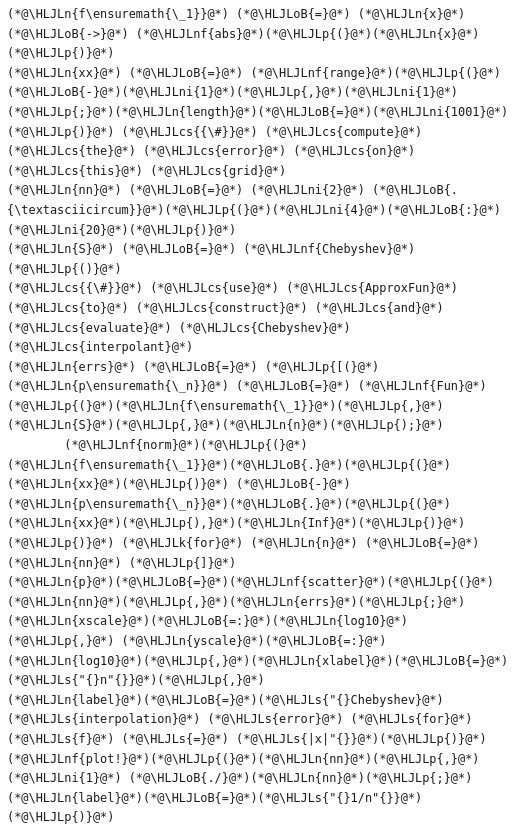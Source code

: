 \documentclass[12pt,a4paper]{article}
\newcommand{\HLJLk}[1]{\textcolor[RGB]{148,91,176}{\textbf{#1}}}
\newcommand{\HLJLn}[1]{#1}
\newcommand{\HLJLnf}[1]{\textcolor[RGB]{66,102,213}{#1}}
\newcommand{\HLJLs}[1]{\textcolor[RGB]{201,61,57}{#1}}
\newcommand{\HLJLni}[1]{\textcolor[RGB]{59,151,46}{#1}}
\newcommand{\HLJLoB}[1]{\textcolor[RGB]{102,102,102}{\textbf{#1}}}
\newcommand{\HLJLp}[1]{#1}
\newcommand{\HLJLcs}[1]{\textcolor[RGB]{153,153,119}{\textit{#1}}}
\begin{document}
\begin{lstlisting}
(*@\HLJLn{f\ensuremath{\_1}}@*) (*@\HLJLoB{=}@*) (*@\HLJLn{x}@*) (*@\HLJLoB{->}@*) (*@\HLJLnf{abs}@*)(*@\HLJLp{(}@*)(*@\HLJLn{x}@*)(*@\HLJLp{)}@*)
(*@\HLJLn{xx}@*) (*@\HLJLoB{=}@*) (*@\HLJLnf{range}@*)(*@\HLJLp{(}@*)(*@\HLJLoB{-}@*)(*@\HLJLni{1}@*)(*@\HLJLp{,}@*)(*@\HLJLni{1}@*)(*@\HLJLp{;}@*)(*@\HLJLn{length}@*)(*@\HLJLoB{=}@*)(*@\HLJLni{1001}@*)(*@\HLJLp{)}@*) (*@\HLJLcs{{\#}}@*) (*@\HLJLcs{compute}@*) (*@\HLJLcs{the}@*) (*@\HLJLcs{error}@*) (*@\HLJLcs{on}@*) (*@\HLJLcs{this}@*) (*@\HLJLcs{grid}@*)
(*@\HLJLn{nn}@*) (*@\HLJLoB{=}@*) (*@\HLJLni{2}@*) (*@\HLJLoB{.{\textasciicircum}}@*)(*@\HLJLp{(}@*)(*@\HLJLni{4}@*)(*@\HLJLoB{:}@*)(*@\HLJLni{20}@*)(*@\HLJLp{)}@*)
(*@\HLJLn{S}@*) (*@\HLJLoB{=}@*) (*@\HLJLnf{Chebyshev}@*)(*@\HLJLp{()}@*)
(*@\HLJLcs{{\#}}@*) (*@\HLJLcs{use}@*) (*@\HLJLcs{ApproxFun}@*) (*@\HLJLcs{to}@*) (*@\HLJLcs{construct}@*) (*@\HLJLcs{and}@*) (*@\HLJLcs{evaluate}@*) (*@\HLJLcs{Chebyshev}@*) (*@\HLJLcs{interpolant}@*)
(*@\HLJLn{errs}@*) (*@\HLJLoB{=}@*) (*@\HLJLp{[(}@*) (*@\HLJLn{p\ensuremath{\_n}}@*) (*@\HLJLoB{=}@*) (*@\HLJLnf{Fun}@*)(*@\HLJLp{(}@*)(*@\HLJLn{f\ensuremath{\_1}}@*)(*@\HLJLp{,}@*)(*@\HLJLn{S}@*)(*@\HLJLp{,}@*)(*@\HLJLn{n}@*)(*@\HLJLp{);}@*)
        (*@\HLJLnf{norm}@*)(*@\HLJLp{(}@*)(*@\HLJLn{f\ensuremath{\_1}}@*)(*@\HLJLoB{.}@*)(*@\HLJLp{(}@*)(*@\HLJLn{xx}@*)(*@\HLJLp{)}@*) (*@\HLJLoB{-}@*) (*@\HLJLn{p\ensuremath{\_n}}@*)(*@\HLJLoB{.}@*)(*@\HLJLp{(}@*)(*@\HLJLn{xx}@*)(*@\HLJLp{),}@*)(*@\HLJLn{Inf}@*)(*@\HLJLp{)}@*)  (*@\HLJLp{)}@*) (*@\HLJLk{for}@*) (*@\HLJLn{n}@*) (*@\HLJLoB{=}@*) (*@\HLJLn{nn}@*) (*@\HLJLp{]}@*)
(*@\HLJLn{p}@*)(*@\HLJLoB{=}@*)(*@\HLJLnf{scatter}@*)(*@\HLJLp{(}@*)(*@\HLJLn{nn}@*)(*@\HLJLp{,}@*)(*@\HLJLn{errs}@*)(*@\HLJLp{;}@*)(*@\HLJLn{xscale}@*)(*@\HLJLoB{=:}@*)(*@\HLJLn{log10}@*)(*@\HLJLp{,}@*) (*@\HLJLn{yscale}@*)(*@\HLJLoB{=:}@*)(*@\HLJLn{log10}@*)(*@\HLJLp{,}@*)(*@\HLJLn{xlabel}@*)(*@\HLJLoB{=}@*)(*@\HLJLs{"{}n"{}}@*)(*@\HLJLp{,}@*)
(*@\HLJLn{label}@*)(*@\HLJLoB{=}@*)(*@\HLJLs{"{}Chebyshev}@*) (*@\HLJLs{interpolation}@*) (*@\HLJLs{error}@*) (*@\HLJLs{for}@*) (*@\HLJLs{f}@*) (*@\HLJLs{=}@*) (*@\HLJLs{|x|"{}}@*)(*@\HLJLp{)}@*)
(*@\HLJLnf{plot!}@*)(*@\HLJLp{(}@*)(*@\HLJLn{nn}@*)(*@\HLJLp{,}@*)(*@\HLJLni{1}@*) (*@\HLJLoB{./}@*)(*@\HLJLn{nn}@*)(*@\HLJLp{;}@*)(*@\HLJLn{label}@*)(*@\HLJLoB{=}@*)(*@\HLJLs{"{}1/n"{}}@*)(*@\HLJLp{)}@*)
\end{lstlisting}
\end{document}
